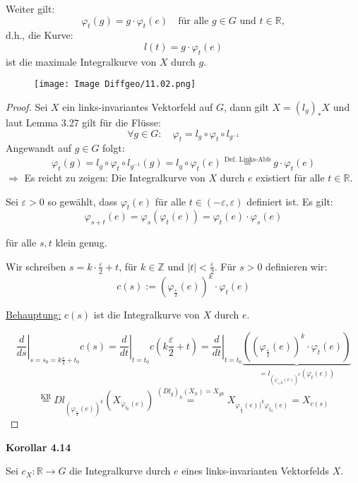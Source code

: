 \documentclass[fleqn, 12pt, letterpaper]{article}
\newcommand{\txt}[1]{\text{#1}}
\begin{document}
Weiter gilt:
\[
\varphi_t(g) = g \cdot \varphi_t(e) \quad \text{für alle } g \in G \text{ und } t \in \mathbb{R},
\]
d.h., die Kurve:
\[
l(t) = g \cdot \varphi_t(e)
\]
ist die maximale Integralkurve von \( X \) durch \( g \).
  \begin{figure}[H]
    \centering
    \texttt{[image: Image Diffgeo/11.02.png]}
 \end{figure}
\begin{proof}
    Sei \( X \) ein links-invariantes Vektorfeld auf \( G \), dann gilt $X=(l_g)_*X$ und laut Lemma 3.27 gilt für die Flüsse:
\[
\forall g \in G: \quad \varphi_t = l_g \circ \varphi_t \circ l_{g^{-1}}
\]
Angewandt auf \( g \in G \) folgt:
\[
\varphi_t(g) = l_g \circ \varphi_t \circ l_{g^{-1}}(g) = l_g \circ \varphi_t(e) \overset{\txt{Def. Links-Abb}}{=} g \cdot \varphi_t(e) \tag{*}
\]
\(\Rightarrow\) Es reicht zu zeigen: Die Integralkurve von \( X \) durch \( e \) existiert für alle \( t \in \mathbb{R} \).

Sei \( \varepsilon > 0 \) so gewählt, dass \( \varphi_t(e) \) für alle \( t \in (-\varepsilon, \varepsilon) \) definiert ist. Es gilt:
\[
\varphi_{s+t}(e) = \varphi_s(\varphi_t(e)) = \varphi_t(e) \cdot \varphi_s(e) \tag{**}
\]

für alle \( s, t \) klein genug.

Wir schreiben \( s = k \cdot \frac{\varepsilon}{2} + t \), für \( k \in \mathbb{Z} \) und \( |t| < \frac{\varepsilon}{2} \). Für \( s > 0 \) definieren wir:
\[
c(s) := \left( \varphi_{\frac{\varepsilon}{2}}(e) \right)^k \cdot \varphi_t(e)
\]

\underline{Behauptung:} \( c(s) \) ist die Integralkurve von \( X \) durch \( e \).

\[
\left.\frac{d}{ds}\right|_{s=s_0 = k \frac{\varepsilon}{2} + t_0} c(s)
= \left.\frac{d}{dt}\right|_{t = t_0} c\left(k \frac{\varepsilon}{2} + t \right) = \left.\frac{d}{dt}\right|_{t = t_0} \underbrace{\left( \left(\varphi_{\frac{\varepsilon}{2}}(e)\right)^k \cdot \varphi_t(e) \right)}_{=l_{(\varphi_{\varepsilon/2}(e))^k}(\varphi_t(e))}
\]
\[
\overset{\txt{KR}}{=} Dl_{ \left(\varphi_{\frac{\varepsilon}{2}}(e)\right)^k } \left( X_{\varphi_{t_0}(e)} \right) \overset{(Dl_g)_h(X_h)=X_{gh}}{=} X_{\varphi_{\frac{\varepsilon}{2}}(e))^k\varphi_{t_0}(e)} = X_{c(s)}
\]
\end{proof}

\textbf{Korollar 4.14}

Sei \( c_X : \mathbb{R} \rightarrow G \) die Integralkurve durch \( e \) eines links-invarianten Vektorfelds \( X \). \\
\end{document}
